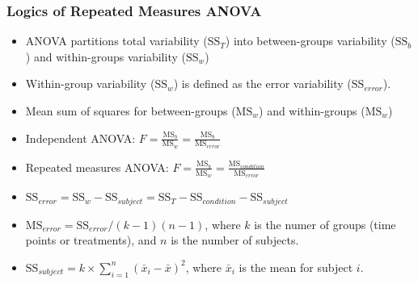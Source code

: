\documentclass[table,10pt]{beamer}\usepackage[]{graphicx}\usepackage[]{color}
\begin{document}
\begin{CJK*}{UTF8}{gbsn}
\begin{frame}[t]
\frametitle{Logics of Repeated Measures ANOVA}
\begin{itemize}
	\item<1-> ANOVA partitions total variability ($\textrm{SS}_T$) into between-groups 
		variability ($\textrm{SS}_b$) and within-groups variability ($\textrm{SS}_w$)
	\item<2-> Within-group variability ($\textrm{SS}_w$) is defined as the error variability 
		($\textrm{SS}_{error}$).
	\item<3-> Mean sum of squares for between-groups ($\textrm{MS}_w$) and within-groups 
		($\textrm{MS}_w$)
	\item<4-> \alert{Independent ANOVA: $F = \frac{\textrm{MS}_b}{\textrm{MS}_w} = \frac{\textrm{MS}_b}{\textrm{MS}_{error}}$}
	\item<5-> \alert{Repeated measures ANOVA: $F = \frac{\textrm{MS}_b}{\textrm{MS}_w} = \frac{\textrm{MS}_{condition}}{\textrm{MS}_{error}}$}
	\item<6-> $\textrm{SS}_{error} = \textrm{SS}_w - \text{SS}_{subject} = \textrm{SS}_T - \textrm{SS}_{condition} - \textrm{SS}_{subject}$
	\item<7-> $\textrm{MS}_{error} = \textrm{SS}_{error}/(k-1)(n-1)$, where $k$ is the numer of groups (time points or treatments), and $n$ is 
		the number of subjects.
	\item<8> $\textrm{SS}_{subject} = k \times \sum_{i=1}^n (\bar{x}_i - \bar{x})^2$, where $\bar{x}_i$ is the mean for subject $i$.
\end{itemize}
\end{frame}



\end{CJK*}
\end{document}
